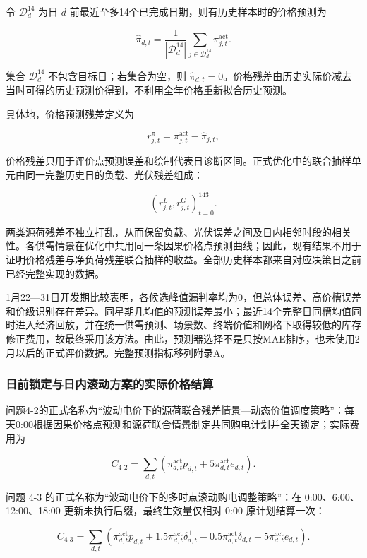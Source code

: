 \documentclass[zihao=-4,a4paper,UTF8,fontset=none]{ctexart}
\begin{document}
令 \(\mathcal D_d^{14}\) 为日 \(d\) 前最近至多14个已完成日期，则有历史样本时的价格预测为

\[
\widehat\pi_{d,t}=\frac{1}{|\mathcal D_d^{14}|}\sum_{j\in\mathcal D_d^{14}}\pi^{\mathrm{act}}_{j,t}.
\tag{11}
\]

集合 \(\mathcal D_d^{14}\) 不包含目标日；若集合为空，则 \(\widehat\pi_{d,t}=0\)。价格残差由历史实际价减去当时可得的历史预测价得到，不利用全年价格重新拟合历史预测。

具体地，价格预测残差定义为

\[
r_{j,t}^{\pi}=\pi_{j,t}^{\mathrm{act}}-\widehat\pi_{j,t},
\tag{11a}
\]

价格残差只用于评价点预测误差和绘制代表日诊断区间。正式优化中的联合抽样单元由同一完整历史日的负载、光伏残差组成：

\[
\left(r_{j,t}^{L},r_{j,t}^{G}\right)_{t=0}^{143}.
\tag{11b}
\]

两类源荷残差不独立打乱，从而保留负载、光伏误差之间及日内相邻时段的相关性。各供需情景在优化中共用同一条因果价格点预测曲线；因此，现有结果不用于证明价格残差与净负荷残差联合抽样的收益。全部历史样本都来自对应决策日之前已经完整实现的数据。

1月22---31日开发期比较表明，各候选峰值漏判率均为0，但总体误差、高价槽误差和价级识别存在差异。同星期几均值的预测误差最小；最近14个完整日同槽均值同时进入经济回放，并在统一供需预测、场景数、终端价值和网格下取得较低的库存修正费用，故最终采用该方法。由此，预测器选择不是只按MAE排序，也未使用2月以后的正式评价数据。完整预测指标移列附录A。

\subsubsection{日前锁定与日内滚动方案的实际价格结算}\label{ux65e5ux524dux9501ux5b9aux4e0eux65e5ux5185ux6edaux52a8ux65b9ux6848ux7684ux5b9eux9645ux4ef7ux683cux7ed3ux7b97}

问题4-2的正式名称为``波动电价下的源荷联合残差情景---动态价值调度策略''：每天0:00根据因果价格点预测和源荷联合情景制定共同购电计划并全天锁定；实际费用为

\[
C_{4\text{-}2}=\sum_{d,t}\left(\pi^{\mathrm{act}}_{d,t}p_{d,t}+5\pi^{\mathrm{act}}_{d,t}e_{d,t}\right).
\tag{12}
\]

问题 4-3 的正式名称为``波动电价下的多时点滚动购电调整策略''：在 0:00、6:00、12:00、18:00 更新未执行后缀，最终生效量仅相对 0:00 原计划结算一次：

\[
C_{4\text{-}3}=\sum_{d,t}\left(\pi^{\mathrm{act}}_{d,t}p_{d,t}+1.5\pi^{\mathrm{act}}_{d,t}\delta^+_{d,t}-0.5\pi^{\mathrm{act}}_{d,t}\delta^-_{d,t}+5\pi^{\mathrm{act}}_{d,t}e_{d,t}\right).
\tag{13}
\]
\end{document}
